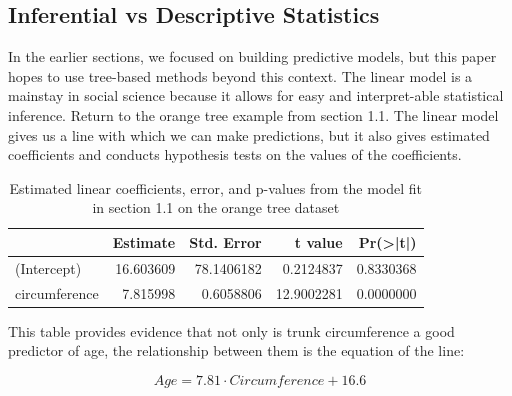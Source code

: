 \documentclass[12pt,twoside]{reedthesis}
\begin{document}
  \subsection{Inferential vs Descriptive
  Statistics}\label{inferential-vs-descriptive-statistics}
  
  In the earlier sections, we focused on building predictive models, but
  this paper hopes to use tree-based methods beyond this context. The
  linear model is a mainstay in social science because it allows for easy
  and interpret-able statistical inference. Return to the orange tree
  example from section 1.1. The linear model gives us a line with which we
  can make predictions, but it also gives estimated coefficients and
  conducts hypothesis tests on the values of the coefficients.
  
  \begin{table}
  
  \caption{\label{tab:unnamed-chunk-8}\label{tab:tablmcoef}Estimated linear coefficients, error, and p-values from the model fit in section 1.1 on the orange tree dataset}
  \centering
  \begin{tabular}[t]{l|r|r|r|r}
  \hline
    & Estimate & Std. Error & t value & Pr(>|t|)\\
  \hline
  (Intercept) & 16.603609 & 78.1406182 & 0.2124837 & 0.8330368\\
  \hline
  circumference & 7.815998 & 0.6058806 & 12.9002281 & 0.0000000\\
  \hline
  \end{tabular}
  \end{table}
  
  This table provides evidence that not only is trunk circumference a good
  predictor of age, the relationship between them is the equation of the
  line:
  
  \[Age = 7.81 \cdot Circumference + 16.6\]
  
\end{document}
